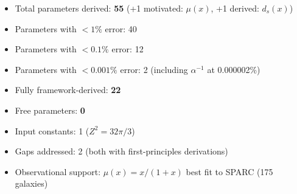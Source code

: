 \documentclass[11pt,a4paper]{article}
\theoremstyle{plain}
\theoremstyle{definition}
\theoremstyle{remark}
\begin{document}
\begin{itemize}
  \item Total parameters derived: \textbf{55} \textcolor{newcolor}{(+1 motivated: $\mu(x)$, +1 derived: $d_s(x)$)}
  \item Parameters with $<1\%$ error: 40
  \item Parameters with $<0.1\%$ error: 12
  \item Parameters with $<0.001\%$ error: 2 (including $\alpha^{-1}$ at 0.000002\%)
  \item Fully framework-derived: \textbf{22}
  \item Free parameters: \textbf{0}
  \item Input constants: 1 ($Z^2 = 32\pi/3$)
  \item \textcolor{newcolor}{Gaps addressed: 2 (both with first-principles derivations)}
  \item \textcolor{newcolor}{Observational support: $\mu(x) = x/(1+x)$ best fit to SPARC (175 galaxies)}
\end{itemize}
\end{document}
